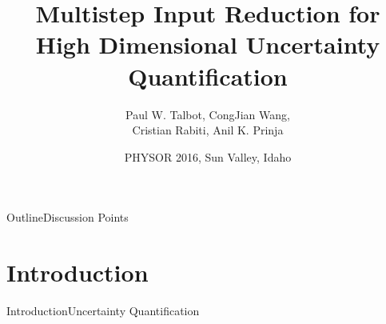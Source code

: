 \documentclass{beamer}
\title[Multistep Input Reduction]
{Multistep Input Reduction for High Dimensional Uncertainty Quantification}
\author[Talbot] %
{Paul W. Talbot\inst{1}, CongJian Wang\inst{2}, \\ Cristian Rabiti\inst{2}, Anil K. Prinja\inst{1}}
\institute[University of New Mexico] %
{
  \inst{1}%
  University of New Mexico\\
  \inst{2}
  Idaho National Laboratory
}
\date[PHYSOR 2016] %
{PHYSOR 2016, Sun Valley, Idaho}
\begin{document}
\begin{frame}
  \titlepage
\end{frame}

\begin{frame}{Outline}{Discussion Points}\vspace{-20pt}
  \tableofcontents%
\end{frame}

\section{Introduction}
\begin{frame}{Introduction}{Uncertainty Quantification}
\end{frame}
\end{document}
